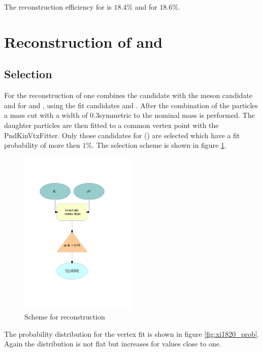 		The reconstruction efficiency for \anticascade is $18.4\%$ and for \cascade $18.6\%$.
		
	
	
	

\section{Reconstruction of \excitedcascade and \excitedanticascade}
		\subsection*{Selection}

		For the reconstruction of \excitedcascade one combines the \lam candidate with the \kminus meson candidate and for \excitedanticascade \alam and \kplus, using the
		fit candidates \lam and \alam.
		After the combination of the particles a mass cut with a width of $0.3$\massunit symmetric to the nominal \excitedcascade mass is performed. 
		The daughter particles are  then fitted to a common vertex point with the PndKinVtxFitter.
		Only those candidates for \excitedcascade (\excitedanticascade) are selected which have a fit probability of more then $1\%$.
		The selection scheme is shown in figure \ref{fig:excitedcascade_scheme}. 
		
		\begin{figure}
			\centering
				\includegraphics[width=0.50\textwidth]{./plots/combineExcitedCascade.pdf}
			\caption{\propose Scheme for \excitedcascade reconstruction}
			\label{fig:excitedcascade_scheme}
		\end{figure}
		
		
		The probability distribution for the vertex fit is shown in figure \ref{fig:xi1820_prob}.
		Again the distribution is not flat but increases for values close to one. 
		
